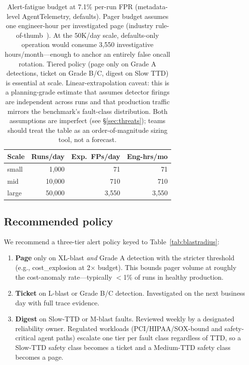 \documentclass[conference]{IEEEtran}
\begin{document}
\begin{table}[t]
\centering
\scriptsize
\caption{Alert-fatigue budget at 7.1\% per-run FPR (metadata-level
AgentTelemetry, defaults). Pager budget assumes one engineer-hour per
investigated page (industry rule-of-thumb~\cite{sre_book}). At the
50K/day scale, defaults-only operation would consume 3{,}550
investigative hours/month---enough to anchor an entirely false
oncall rotation. Tiered policy (page only on Grade A detections,
ticket on Grade B/C, digest on Slow TTD) is essential at scale.
Linear-extrapolation caveat: this is a planning-grade estimate that
assumes detector firings are independent across runs and that
production traffic mirrors the benchmark's fault-class distribution.
Both assumptions are imperfect (see \S\ref{sec:threats}); teams
should treat the table as an order-of-magnitude sizing tool, not a
forecast.}
\label{tab:alertbudget}
\begin{tabular}{@{}lrrr@{}}
\toprule
\textbf{Scale} & \textbf{Runs/day} & \textbf{Exp.\ FPs/day} & \textbf{Eng-hrs/mo} \\
\midrule
small  & 1{,}000   & 71    & 71 \\
mid    & 10{,}000  & 710   & 710 \\
large  & 50{,}000  & 3{,}550 & 3{,}550 \\
\bottomrule
\end{tabular}
\end{table}

\subsection{Recommended policy}

We recommend a three-tier alert policy keyed to
Table~\ref{tab:blastradius}:

\begin{enumerate}[nosep,leftmargin=*]
\item \textbf{Page} only on XL-blast \emph{and} Grade A detection
  with the stricter threshold (e.g., cost\_explosion at 2$\times$
  budget). This bounds pager volume at roughly the cost-anomaly
  rate---typically $<$1\% of runs in healthy production.
\item \textbf{Ticket} on L-blast or Grade B/C detection. Investigated
  on the next business day with full trace evidence.
\item \textbf{Digest} on Slow-TTD or M-blast faults. Reviewed weekly
  by a designated reliability owner. Regulated workloads
  (PCI/HIPAA/SOX-bound and safety-critical agent paths) escalate one
  tier per fault class regardless of TTD, so a Slow-TTD safety class
  becomes a ticket and a Medium-TTD safety class becomes a page.
\end{enumerate}
\end{document}
